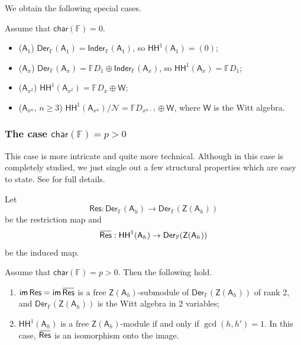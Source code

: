 \documentclass{commat}
\newcommand{\overbar}[1]{\mkern 1mu\overline{\mkern-1mu#1\mkern-1mu}\mkern 1mu}
\newcommand{\FF}{\mathbb{F}}
\newcommand{\A}{\mathsf{A}}
\newcommand\chara{\mathsf {char}}
\newcommand\inder{ \mathsf {Inder_\FF}}
\newcommand\der[1][\FF]{ \mathsf{Der}_{#1}}
\newcommand\hoch{\mathsf{HH}}
\newcommand\im{\mathsf{im}}
\begin{document}
We obtain the following special cases.
\begin{corollary}
	Assume that $\chara(\FF) = 0$. 
	\begin{itemize}
		\item[] ($\A_1$) $\der(\A_1) = \inder(\A_1)$, so $\hoch^1(\A_1) = (0)$; 
		
		\item[] ($\A_x$)  $\der(\A_x) = \FF D_1 \oplus \inder(\A_x)$, so $\hoch^1(\A_x)=\FF D_1$;
		
		\item[] ($\A_{x^2}$)   $\displaystyle \hoch^1(\A_{x^2})  =  \FF D_{x} \oplus \mathsf{W}$;
		
		\item[] ($\A_{x^n}$,  $n \geq 3$)   $\displaystyle \hoch^1(\A_{x^n})/\mathcal N  =  \FF D_{x^{n-1}} \oplus \mathsf{W}$, where $\mathsf{W}$ is  the Witt algebra. 
	\end{itemize}
\end{corollary}


\subsubsection{The case \texorpdfstring{$\chara(\FF)=p>0$}{char(F)=p>0}}\label{SSS:hh1:charp}

This case is more intricate and quite more technical. Although in \cite{BLO15ja} this case is completely studied, we just single out a few structural properties which are easy to state. See \cite[Sec.\ 6]{BLO15ja} for full details.

Let  $$\mathsf{Res}: \der(\A_h) \rightarrow \der(\mathsf{Z}(\A_h))$$ be the restriction map  and \[ \overbar{\mathsf{Res}}: \hoch^1(\A_h)  \rightarrow \der(\mathsf{Z}(\A_h))\] be the induced map.

\begin{theorem}
	Assume that $\chara(\FF) = p>0$. Then the following hold.
	\begin{enumerate}[label=(\alph*)]
		\item $\im\,\mathsf{Res}= \im\,\mathsf{\overbar{Res}}$ is a free $\mathsf{Z}(\A_h)$-submodule of $\der(\mathsf{Z}(\A_h))$ of rank 2, and $\der(\mathsf{Z}(\A_h))$ is the Witt algebra in 2 variables;
		\item $\hoch^1(\A_h)$ is a  free $\mathsf{Z}(\A_h)$-module if and only if $\gcd (h, h')=1$. 
		In this case, $\mathsf{\overbar{Res}}$ is an isomorphism onto the image.
	\end{enumerate}
\end{theorem}
\end{document}

